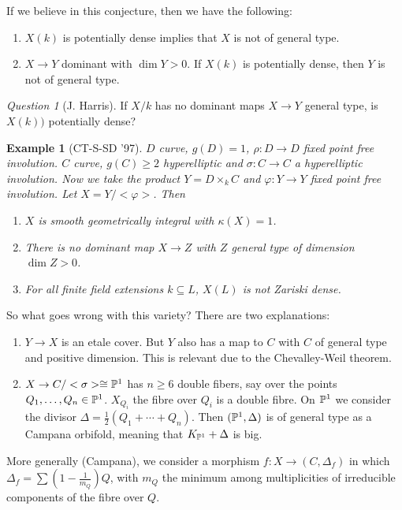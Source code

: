 \documentclass[A4paper, british, reqno]{amsart}
\theoremstyle{darkgreentheorem}
\theoremstyle{darkbluedefinition}
\theoremstyle{darkredexample}
\newtheorem{exa}[thm]{Example}
\theoremstyle{remark}
\newtheorem{q}[thm]{Question}
\newcommand{\1}{\mathbbm{1}}
\newcommand{\sub}{\subseteq}
\begin{document}
If we believe in this conjecture, then we have the following:
\begin{enumerate}
    \item $X(k)$ is potentially dense implies that $X$ is not of general type.
    \item $X\to Y$ dominant with $\dim{Y}>0$.
	If $X(k)$ is potentially dense, then $Y$ is not of general type.
\end{enumerate}

\begin{q}[J. Harris]
    If $X/k$ has no dominant maps $X\to Y$ general type, is $X(k))$ potentially dense?
\end{q}

\begin{exa}[CT-S-SD '97]
    $D$ curve, $g(D)=1$, $\rho\colon D\to D$ fixed point free involution.
    $C$ curve, $g(C)\geqslant 2$ hyperelliptic and $\sigma\colon C\to C$ a hyperelliptic involution.
    Now we take the product $Y=D\times_{k} C$ and $\varphi\colon Y\to Y$ fixed point free involution.
    Let $X=Y/<\varphi >$.
    Then
    \begin{enumerate}
	\item $X$ is smooth geometrically integral with $\kappa(X)=1$.
	\item There is no dominant map $X\to Z$ with $Z$ general type of dimension $\dim{Z}>0$.
	\item For all finite field extensions $k\sub L$, $X(L)$ is not Zariski dense.
    \end{enumerate}
\end{exa}

So what goes wrong with this variety?
There are two explanations:
\begin{enumerate}
    \item $Y\to X$ is an etale cover.
	But $Y$ also has a map to $C$ with $C$ of general type and positive dimension.
	This is relevant due to the Chevalley-Weil theorem.
    \item $X\to C/<\sigma>\cong \P^{1}$ has $n\geqslant 6$ double fibers, say over the points $Q_{1},\ldots,Q_{n}\in \P^{1}$.
	$X_{Q_{i}}$ the fibre over $Q_{i}$ is a double fibre.
	On $\P^{1}$ we consider the divisor $\Delta=\frac{1}{2}(Q_{1}+\cdots +Q_{n})$.
	Then $(\P^{1},\Delta)$ is of general type as a Campana orbifold, meaning that $K_{\P^{1}}+\Delta$ is big.
\end{enumerate}

More generally (Campana), we consider a morphism $f\colon X\to (C,\Delta_{f})$ in which $\Delta_{f}=\sum(1-\frac{1}{m_{Q}})Q$, with $m_{Q}$ the minimum among multiplicities of irreducible components of the fibre over $Q$.
\end{document}
